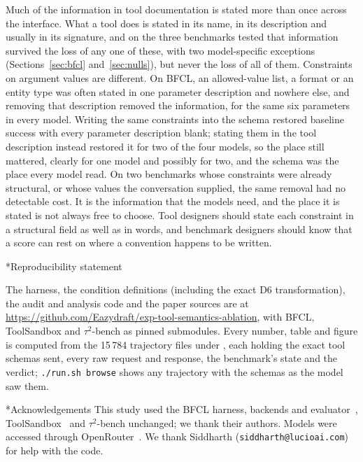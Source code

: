 \documentclass[10pt]{article}
\makeatletter
\renewcommand\section{\@startsection{section}{1}{\z@}{-3.4ex plus -.8ex minus -.3ex}{1.2ex plus .2ex}{\normalfont\large\bfseries}}
\makeatother
\begin{document}
Much of the information in tool documentation is stated more than once across the interface. What a tool does is stated in its name, in its description and usually in its signature, and on the three benchmarks tested that information survived the loss of any one of these, with two model-specific exceptions (Sections~\ref{sec:bfcl} and~\ref{sec:nulls}), but never the loss of all of them. Constraints on argument values are different. On BFCL, an allowed-value list, a format or an entity type was often stated in one parameter description and nowhere else, and removing that description removed the information, for the same six parameters in every model. Writing the same constraints into the schema restored baseline success with every parameter description blank; stating them in the tool description instead restored it for two of the four models, so the place still mattered, clearly for one model and possibly for two, and the schema was the place every model read. On two benchmarks whose constraints were already structural, or whose values the conversation supplied, the same removal had no detectable cost. It is the information that the models need, and the place it is stated is not always free to choose. Tool designers should state each constraint in a structural field as well as in words, and benchmark designers should know that a score can rest on where a convention happens to be written.

\section*{Reproducibility statement}
\begin{sloppypar}
The harness, the condition definitions (including the exact D6 transformation), the audit and analysis code and the paper sources are at \url{https://github.com/Eazydraft/exp-tool-semantics-ablation}, with BFCL, ToolSandbox and $\tau^2$-bench as pinned submodules. Every number, table and figure is computed from the 15\,784 trajectory files under , each holding the exact tool schemas sent, every raw request and response, the benchmark's state and the verdict; \texttt{./run.sh browse} shows any trajectory with the schemas as the model saw them.
\end{sloppypar}

\section*{Acknowledgements}
This study used the BFCL harness, backends and evaluator~\citep{patil2025bfcl,gorilla-repo}, ToolSandbox~\citep{lu2024toolsandbox} and $\tau^2$-bench unchanged; we thank their authors. Models were accessed through OpenRouter~\citep{openrouter}. We thank Siddharth (\texttt{siddharth@lucioai.com}) for help with the code.
\end{document}

